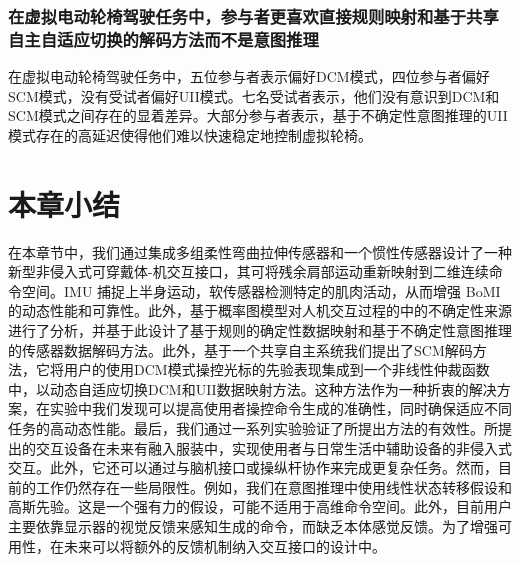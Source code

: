 \subsubsection{在虚拟电动轮椅驾驶任务中，参与者更喜欢直接规则映射和基于共享自主自适应切换的解码方法而不是意图推理}在虚拟电动轮椅驾驶任务中，五位参与者表示偏好DCM模式，四位参与者偏好SCM模式，没有受试者偏好UII模式。七名受试者表示，他们没有意识到DCM和SCM模式之间存在的显着差异。大部分参与者表示，基于不确定性意图推理的UII模式存在的高延迟使得他们难以快速稳定地控制虚拟轮椅。

\section{本章小结}在本章节中，我们通过集成多组柔性弯曲拉伸传感器和一个惯性传感器设计了一种新型非侵入式可穿戴体-机交互接口，其可将残余肩部运动重新映射到二维连续命令空间。IMU 捕捉上半身运动，软传感器检测特定的肌肉活动，从而增强 BoMI 的动态性能和可靠性。此外，基于概率图模型对人机交互过程的中的不确定性来源进行了分析，并基于此设计了基于规则的确定性数据映射和基于不确定性意图推理的传感器数据解码方法。此外，基于一个共享自主系统我们提出了SCM解码方法，它将用户的使用DCM模式操控光标的先验表现集成到一个非线性仲裁函数中，以动态自适应切换DCM和UII数据映射方法。这种方法作为一种折衷的解决方案，在实验中我们发现可以提高使用者操控命令生成的准确性，同时确保适应不同任务的高动态性能。最后，我们通过一系列实验验证了所提出方法的有效性。所提出的交互设备在未来有融入服装中，实现使用者与日常生活中辅助设备的非侵入式交互。此外，它还可以通过与脑机接口或操纵杆协作来完成更复杂任务。然而，目前的工作仍然存在一些局限性。例如，我们在意图推理中使用线性状态转移假设和高斯先验。这是一个强有力的假设，可能不适用于高维命令空间。此外，目前用户主要依靠显示器的视觉反馈来感知生成的命令，而缺乏本体感觉反馈。为了增强可用性，在未来可以将额外的反馈机制纳入交互接口的设计中。
